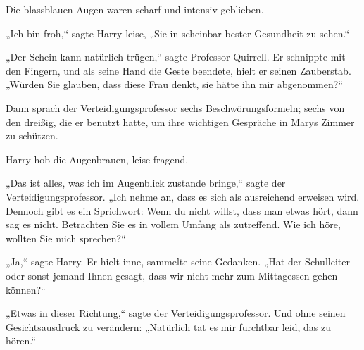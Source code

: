 Die blassblauen Augen waren scharf und intensiv geblieben.

„Ich bin froh,“ sagte Harry leise, „Sie in scheinbar bester Gesundheit zu sehen.“

„Der Schein kann natürlich trügen,“ sagte Professor Quirrell. Er schnippte mit den Fingern, und als seine Hand die Geste beendete, hielt er seinen Zauberstab. „Würden Sie glauben, dass diese Frau denkt, sie hätte ihn mir abgenommen?“

Dann sprach der Verteidigungsprofessor sechs Beschwörungsformeln; sechs von den dreißig, die er benutzt hatte, um ihre wichtigen Gespräche in Marys Zimmer zu schützen.

Harry hob die Augenbrauen, leise fragend.

„Das ist alles, was ich im Augenblick zustande bringe,“ sagte der Verteidigungsprofessor. „Ich nehme an, dass es sich als ausreichend erweisen wird. Dennoch gibt es ein Sprichwort: Wenn du nicht willst, dass man etwas hört, dann sag es nicht. Betrachten Sie es in vollem Umfang als zutreffend. Wie ich höre, wollten Sie mich sprechen?“

„Ja,“ sagte Harry. Er hielt inne, sammelte seine Gedanken. „Hat der Schulleiter oder sonst jemand Ihnen gesagt, dass wir nicht mehr zum Mittagessen gehen können?“

„Etwas in dieser Richtung,“ sagte der Verteidigungsprofessor. Und ohne seinen Gesichtsausdruck zu verändern: „Natürlich tat es mir furchtbar leid, das zu hören.“

